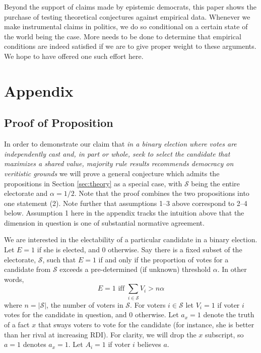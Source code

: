 \documentclass[11pt]{article}
\begin{document}
Beyond the support of claims made by epistemic democrats, this paper shows the purchase of testing theoretical conjectures against empirical data. Whenever we make instrumental claims in politics, we do so conditional on a certain state of the world being the case. More needs to be done to determine that empirical conditions are indeed satisfied if we are to give proper weight to these arguments. We hope to have offered one such effort here.



\section{Appendix}
\subsection{Proof of Proposition}


In order to demonstrate our claim that \emph{in a binary election where votes are independently cast and, in part or whole, seek to select the candidate that maximizes a shared value, majority rule results recommends democracy on veritistic grounds}
we will prove a general conjecture which admits the propositions in Section \ref{sec:theory} as a special case, with $\mathcal{S}$ being the entire electorate and $\alpha=1/2$. Note that the proof combines the two propositions into one statement (2). Note further that assumptions 1--3 above correspond to 2--4 below. Assumption 1 here in the appendix tracks the intuition above that the dimension in question is one of substantial normative agreement. 

We are interested in the electability of a particular candidate in a binary election. Let $E=1$ if she is elected, and 0 otherwise.
Say there is a fixed subset of the electorate, $\mathcal{S}$, such that $E=1$ if and only if the proportion of votes for a candidate from $\mathcal{S}$ exceeds a pre-determined (if unknown) threshold $\alpha$. In other words,
\begin{equation}
E =1 \text{ iff } \sum_{i\in \mathcal{S}} V_i>n\alpha
\end{equation}
where $n=|\mathcal{S}|$, the number of voters in $\mathcal{S}$.
For voters $i\in \mathcal{S}$ let $V_i=1$ if voter $i$ votes for the candidate in question, and 0 otherwise.
Let $a_x=1$ denote the truth of a fact $x$ that sways voters to vote for the candidate (for instance, she is better than her rival at increasing RDI).
For clarity, we will drop the $x$ subscript, so $a=1$ denotes $a_x=1$.
Let $A_i=1$ if voter $i$ believes $a$.
\end{document}
